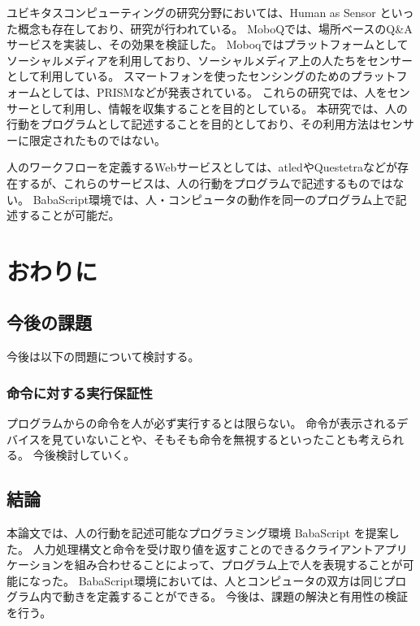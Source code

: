 \documentclass{deimj}
\begin{document}
ユビキタスコンピューティングの研究分野においては、Human as Sensor といった概念も存在しており、研究が行われている。
MoboQ\cite{moboq}では、場所ベースのQ\&Aサービスを実装し、その効果を検証した。
Moboqではプラットフォームとしてソーシャルメディアを利用しており、ソーシャルメディア上の人たちをセンサーとして利用している。
スマートフォンを使ったセンシングのためのプラットフォームとしては、PRISM\cite{prism}などが発表されている。
これらの研究では、人をセンサーとして利用し、情報を収集することを目的としている。
本研究では、人の行動をプログラムとして記述することを目的としており、その利用方法はセンサーに限定されたものではない。

人のワークフローを定義するWebサービスとしては、atled\cite{atled}やQuestetra\cite{questetra}などが存在するが、これらのサービスは、人の行動をプログラムで記述するものではない。
BabaScript環境では、人・コンピュータの動作を同一のプログラム上で記述することが可能だ。

\section{おわりに}
\subsection{今後の課題}
今後は以下の問題について検討する。
\subsubsection{命令に対する実行保証性}
プログラムからの命令を人が必ず実行するとは限らない。
命令が表示されるデバイスを見ていないことや、そもそも命令を無視するといったことも考えられる。
今後検討していく。

\subsection{結論}
本論文では、人の行動を記述可能なプログラミング環境 BabaScript を提案した。
人力処理構文と命令を受け取り値を返すことのできるクライアントアプリケーションを組み合わせることによって、プログラム上で人を表現することが可能になった。
BabaScript環境においては、人とコンピュータの双方は同じプログラム内で動きを定義することができる。
今後は、課題の解決と有用性の検証を行う。

\vspace{5mm}
\end{document}
